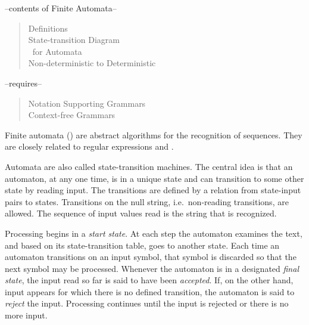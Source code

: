





\begin{center}
\begin{small}
\noindent --contents of Finite Automata--
\begin{quote}
\raggedright
Definitions\\
State-transition Diagram\\
\cfg\ for Automata\\
Non-deterministic to Deterministic\\
\end{quote}
--requires--
\begin{quote}
\raggedright
Notation Supporting Grammars\\
Context-free Grammars\\
\end{quote}
\end{small}
\end{center}

\vspace{1em}


\vspace{1em}

Finite automata (\fa)\index{\fa} are abstract algorithms for 
the recognition of sequences.  
They are closely related to regular expressions and .

Automata are also called state-transition machines.  
The central idea is that an automaton, at any one time, 
is in a unique state and can transition to some other state 
by reading input.  
The transitions are defined by a relation from state-input pairs to states.  
Transitions on the null string, i.e.~non-reading transitions, are allowed.  
The sequence of input values read is the string that is recognized. 

Processing begins in a {\em start state}.  
At each step the automaton examines the text, 
and based on its state-transition table, goes to another state.  
Each time an automaton transitions on an input symbol,
that symbol is discarded so that the next symbol may be processed.
Whenever the automaton is in a designated {\em final
state}, the input read so far is said to have been
{\em accepted}. 
If, on the other hand, input appears 
for which there is no defined transition, 
the automaton is said to {\em reject\/}  the input.  
Processing continues until the input is rejected or there is no more input.  

